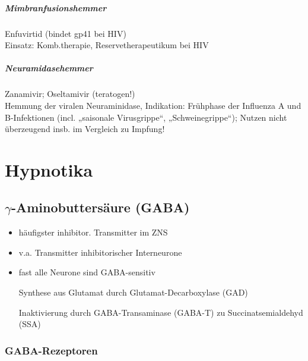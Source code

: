 \documentclass[10pt,a4paper]{report}
\begin{document}
\paragraph{Mimbranfusionshemmer} %
\label{par:mimbranfusionshemmer}
Enfuvirtid (bindet gp41 bei HIV)\\ Einsatz: Komb.therapie, Reservetherapeutikum bei HIV
\paragraph{Neuramidasehemmer} %
\label{par:neuramidasehemmer}
Zanamivir; Oseltamivir (teratogen!)\\
Hemmung der viralen Neuraminidase, Indikation: Frühphase der Influenza A und B-Infektionen (incl. „saisonale Virusgrippe“, „Schweinegrippe“); Nutzen nicht überzeugend insb. im Vergleich zu Impfung!
\chapter{Hypnotika} %
\label{cha:hypnotika}
\section{$\gamma$-Aminobuttersäure (GABA)} %
\label{sec:section_name}
\begin{itemize}
	\item häufigster inhibitor. Transmitter im ZNS 
	\item v.a. Transmitter inhibitorischer Interneurone
	\item fast alle Neurone sind GABA-sensitiv
	\item[Synthese]aus Glutamat durch Glutamat-Decarboxylase (GAD)
	\item[Inaktivierung] durch GABA-Transaminase (GABA-T)  zu Succinatsemialdehyd (SSA)
\end{itemize}
\subsection{GABA-Rezeptoren} %
\label{sub:gaba_rezeptoren}
\end{document}
